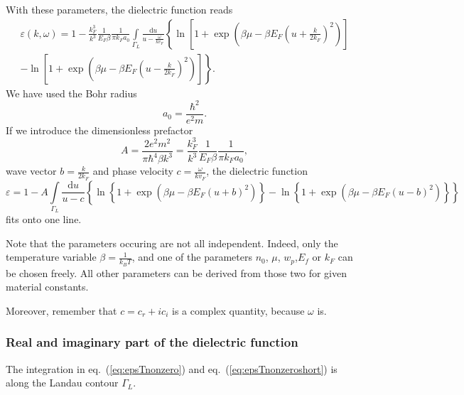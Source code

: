 \documentclass[physics,phd,nolot,nolof]{uccthesis}%
\begin{document}
{With these parameters, the dielectric function reads
\begin{equation}
  \begin{split}
  \varepsilon(k,\omega)=1-
  \frac{k_{F}^3}{k^3}\frac{1}{E_F\beta}\frac{1}{\pi k_F a_0}
  \int\limits_{\Gamma_L}\frac{\mathrm{d} u}{u-\frac{\omega}{k v_F}} 
  \left\{
   \ln\left[ 1+\exp\left(\beta\mu- \beta E_F(u+\frac{k}{2k_F})^2 \right)\right]
   \right. \\ \left.
  -\ln\left[ 1+\exp\left(\beta\mu- \beta E_F(u-\frac{k}{2k_F})^2 \right)\right]
  \right\}.
  \end{split}
  \label{eq:epsTnonzero}
\end{equation}
We have used the Bohr radius
\begin{equation}
  a_0=\frac{\hbar^2}{e^2 m}.
  \label{eq:a0}
\end{equation}
If we introduce the dimensionless prefactor 
\begin{equation}
  A=\frac{2e^2 m^2}{\pi \hbar^4 \beta k^3}=
\frac{k_{F}^3}{k^3}\frac{1}{E_F\beta}\frac{1}{\pi k_F a_0},
  \label{eq:perfactorA}
\end{equation}
wave vector
$b=\frac{k}{2k_F}$
and phase velocity
$c=\frac{\omega}{k v_F}$,
the dielectric function 
\begin{equation}
  \varepsilon = 1-A 
  \int\limits_{\Gamma_L} \frac{\mathrm{d} u}{u-c} 
  \left\lbrace
   \ln \left\{  1+\exp\left(\beta\mu- \beta E_F(u+b)^2 \right) \right\}
   -\ln \left\{ 1+\exp\left(\beta\mu- \beta E_F(u-b)^2 \right) \right\} 
  \right\rbrace
  \label{eq:epsTnonzeroshort}
\end{equation}
fits onto one line.

Note that the parameters occuring are not all independent. 
Indeed, only the temperature variable $\beta=\frac{1}{k_B T}$, 
and one of the parameters $n_0$, $\mu$, $w_p$,$E_f$ or $k_F$ can be chosen freely.
All other parameters can be derived from those two for given material constants. 

Moreover, remember that $c=c_r+ic_i$ is a complex quantity, because $\omega$ is.
\subsubsection{Real and imaginary part  of the dielectric function}
The integration in eq.~(\ref{eq:epsTnonzero}) and eq.~(\ref{eq:epsTnonzeroshort}) is along the Landau contour $\Gamma_L$. 
}
\end{document}
